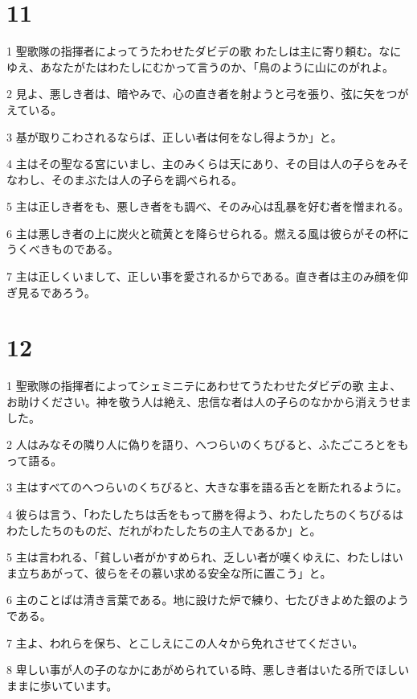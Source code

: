 \chapter{11}

\par 1 聖歌隊の指揮者によってうたわせたダビデの歌 わたしは主に寄り頼む。なにゆえ、あなたがたはわたしにむかって言うのか、「鳥のように山にのがれよ。
\par 2 見よ、悪しき者は、暗やみで、心の直き者を射ようと弓を張り、弦に矢をつがえている。
\par 3 基が取りこわされるならば、正しい者は何をなし得ようか」と。
\par 4 主はその聖なる宮にいまし、主のみくらは天にあり、その目は人の子らをみそなわし、そのまぶたは人の子らを調べられる。
\par 5 主は正しき者をも、悪しき者をも調べ、そのみ心は乱暴を好む者を憎まれる。
\par 6 主は悪しき者の上に炭火と硫黄とを降らせられる。燃える風は彼らがその杯にうくべきものである。
\par 7 主は正しくいまして、正しい事を愛されるからである。直き者は主のみ顔を仰ぎ見るであろう。

\chapter{12}

\par 1 聖歌隊の指揮者によってシェミニテにあわせてうたわせたダビデの歌 主よ、お助けください。神を敬う人は絶え、忠信な者は人の子らのなかから消えうせました。
\par 2 人はみなその隣り人に偽りを語り、へつらいのくちびると、ふたごころとをもって語る。
\par 3 主はすべてのへつらいのくちびると、大きな事を語る舌とを断たれるように。
\par 4 彼らは言う、「わたしたちは舌をもって勝を得よう、わたしたちのくちびるはわたしたちのものだ、だれがわたしたちの主人であるか」と。
\par 5 主は言われる、「貧しい者がかすめられ、乏しい者が嘆くゆえに、わたしはいま立ちあがって、彼らをその慕い求める安全な所に置こう」と。
\par 6 主のことばは清き言葉である。地に設けた炉で練り、七たびきよめた銀のようである。
\par 7 主よ、われらを保ち、とこしえにこの人々から免れさせてください。
\par 8 卑しい事が人の子のなかにあがめられている時、悪しき者はいたる所でほしいままに歩いています。

